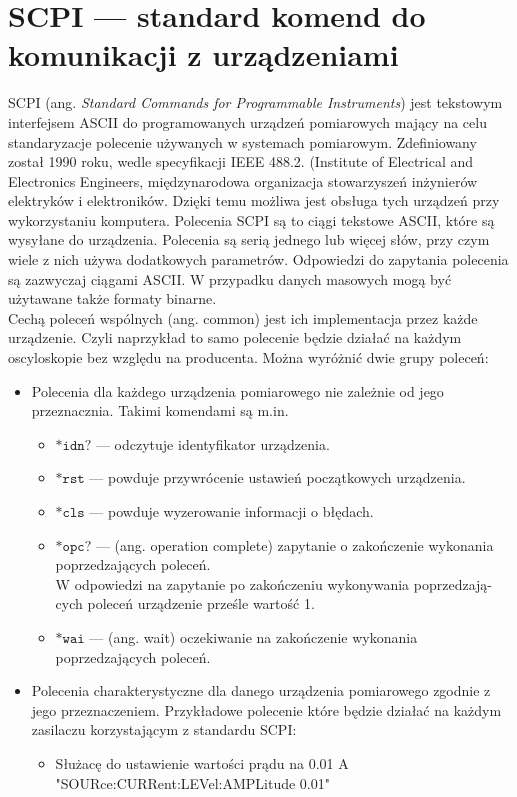 \documentclass[a4paper, portrait,12pt]{report}
\begin{document}
\section{SCPI --- standard komend do komunikacji z urządzeniami}
SCPI  (ang. \textit{Standard  Commands  for  Programmable  Instruments}) jest tekstowym interfejsem ASCII do programowanych urządzeń pomiarowych mający na celu standaryzacje polecenie używanych w systemach pomiarowym. Zdefiniowany został 1990 roku, wedle specyfikacji IEEE 488.2. (Institute of Electrical and Electronics Engineers, międzynarodowa organizacja stowarzyszeń inżynierów elektryków i elektroników.  Dzięki temu możliwa jest obsługa tych urządzeń przy wykorzystaniu komputera. Polecenia SCPI są to ciągi tekstowe ASCII, które są wysyłane do urządzenia. Polecenia są serią jednego lub więcej słów, przy czym wiele z nich używa dodatkowych parametrów. Odpowiedzi do zapytania polecenia są zazwyczaj ciągami ASCII. W przypadku danych masowych mogą być użytawane także formaty binarne. \\

Cechą  poleceń  wspólnych  (ang.  common)  jest  ich  implementacja  przez  każde urządzenie. Czyli naprzykład to samo polecenie będzie działać na każdym oscyloskopie bez względu na producenta. Można wyróżnić dwie grupy poleceń:
\begin{itemize}
\item Polecenia dla każdego urządzenia pomiarowego nie zależnie od jego przeznacznia. Takimi komendami są m.in.
\begin{itemize}
\item $\mathtt{*idn?}$ --- odczytuje identyfikator urządzenia. 
\item $\mathtt{*rst}$ --- powduje przywrócenie ustawień początkowych urządzenia.
\item $\mathtt{*cls}$ --- powduje wyzerowanie informacji o błędach.
\item $\mathtt{*opc?}$  --- (ang.  operation  complete)  zapytanie  o  zakończenie  wykonania
poprzedzających poleceń. \\
W  odpowiedzi  na  zapytanie  po  zakończeniu  wykonywania  poprzedzają-
cych poleceń urządzenie prześle wartość 1.
\item $\mathtt{*wai}$ ---  (ang.  wait)  oczekiwanie  na  zakończenie  wykonania  poprzedzających poleceń.
\end{itemize}

\item Polecenia charakterystyczne dla danego urządzenia pomiarowego zgodnie z jego przeznaczeniem. Przykładowe polecenie które będzie działać na każdym zasilaczu korzystającym z standardu SCPI:
\begin{itemize}
\item Służacę do ustawienie wartości prądu na 0.01 A \\ "SOURce:CURRent:LEVel:AMPLitude  0.01" 
\end{itemize}
\end{itemize}
\end{document}
